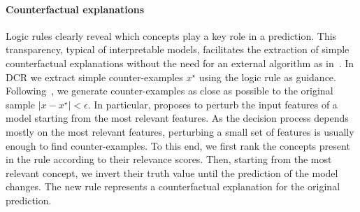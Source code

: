 

\paragraph{Counterfactual explanations}
Logic rules clearly reveal which concepts play a key role in a prediction. This transparency, typical of interpretable models, facilitates the extraction of simple counterfactual explanations without the need for an external algorithm as in~\citet{abid2021meaningfully}. 
In DCR we extract simple counter-examples $x^\star$ using the logic rule as guidance. Following~\citet{wachter2017counterfactual}, we generate counter-examples as close as possible to the original sample $|x - x^\star|< \epsilon$. In particular, \citet{wachter2017counterfactual} proposes to perturb the input features of a model starting from the most relevant features. As the decision process depends mostly on the most relevant features, perturbing a small set of features is usually enough to find counter-examples. To this end, we first rank the concepts present in the rule according to their relevance scores. Then, starting from the most relevant concept, we invert their truth value until the prediction of the model changes. The new rule represents a counterfactual explanation for the original prediction.

